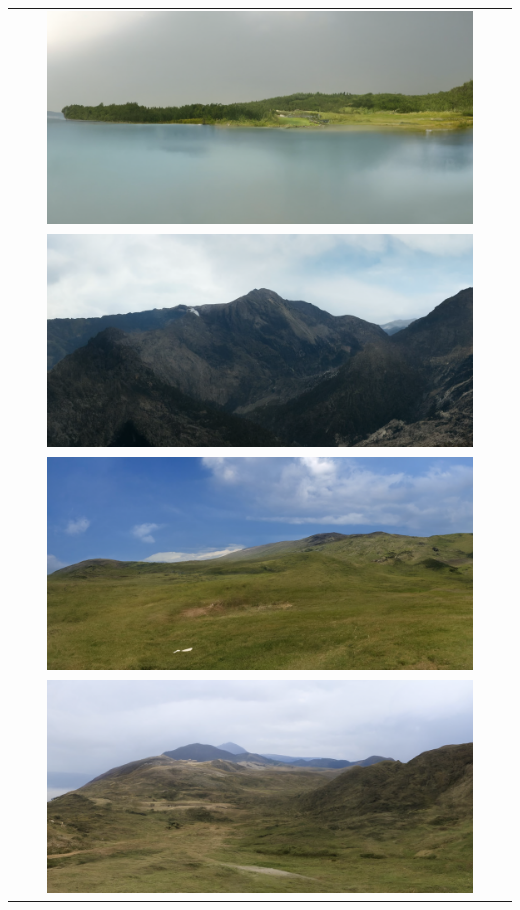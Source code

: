 \begin{longtable}{c}
    \includegraphics[width=0.87\textwidth]{Chapters/figures/appendix/flickr/1_uncond_sample.png} \\
    \includegraphics[width=0.87\textwidth]{Chapters/figures/appendix/flickr/10_uncond_sample.png} \\
    \includegraphics[width=0.87\textwidth]{Chapters/figures/appendix/flickr/11_uncond_sample.png} \\
    \includegraphics[width=0.87\textwidth]{Chapters/figures/appendix/flickr/18_uncond_sample.png} \\

\end{longtable}

